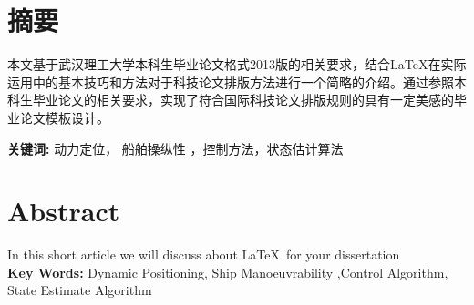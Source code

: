 \section*{ \centering 摘要}

\vskip0.5cm
本文基于武汉理工大学本科生毕业论文格式2013版的相关要求，结合\LaTeX 在实际运用中的基本技巧和方法对于科技论文排版方法进行一个简略的介绍。通过参照本科生毕业论文的相关要求，实现了符合国际科技论文排版规则的具有一定美感的毕业论文模板设计。 


\textbf{ 关键词:}  动力定位， 船舶操纵性 ，控制方法，状态估计算法

\clearpage
\section*{ \centering \textbf{Abstract} }

In this short article we will discuss about \LaTeX\,  for your dissertation \\

\textbf{ Key Words:} Dynamic Positioning, Ship Manoeuvrability ,Control Algorithm, State Estimate Algorithm




